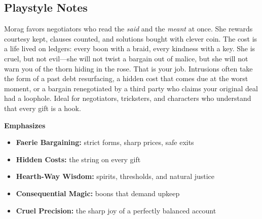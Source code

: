\subsection*{Playstyle Notes}
Morag favors negotiators who read the \emph{said} and the \emph{meant} at once. She rewards courtesy kept, clauses counted, and solutions bought with clever coin. The cost is a life lived on ledgers: every boon with a braid, every kindness with a key. She is cruel, but not evil---she will not twist a bargain out of malice, but she will not warn you of the thorn hiding in the rose. That is your job. Intrusions often take the form of a past debt resurfacing, a hidden cost that comes due at the worst moment, or a bargain renegotiated by a third party who claims your original deal had a loophole. Ideal for negotiators, tricksters, and characters who understand that every gift is a hook.

\noindent\textbf{Emphasizes}
\begin{itemize}
  \item \textbf{Faerie Bargaining:} strict forms, sharp prices, safe exits
  \item \textbf{Hidden Costs:} the string on every gift
  \item \textbf{Hearth-Way Wisdom:} spirits, thresholds, and natural justice
  \item \textbf{Consequential Magic:} boons that demand upkeep
  \item \textbf{Cruel Precision:} the sharp joy of a perfectly balanced account
\end{itemize}